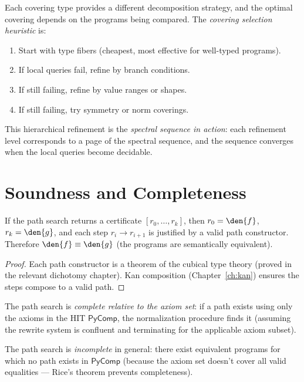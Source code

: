 Each covering type provides a different decomposition strategy,
and the optimal covering depends on the programs being compared.
The \emph{covering selection heuristic} is:
\begin{enumerate}
  \item Start with type fibers (cheapest, most effective for
    well-typed programs).
  \item If local queries fail, refine by branch conditions.
  \item If still failing, refine by value ranges or shapes.
  \item If still failing, try symmetry or norm coverings.
\end{enumerate}

This hierarchical refinement is the \emph{spectral sequence in
action}: each refinement level corresponds to a page of the
spectral sequence, and the sequence converges when the local
queries become decidable.


\section{Soundness and Completeness}

\begin{theorem}
If the path search returns a certificate $[r_0, \ldots, r_k]$, then
$r_0 = \den{f}$, $r_k = \den{g}$, and each step $r_i \to r_{i+1}$
is justified by a valid path constructor.  Therefore
$\den{f} \equiv \den{g}$ (the programs are semantically equivalent).
\end{theorem}

\begin{proof}
Each path constructor is a theorem of the cubical type theory
(proved in the relevant dichotomy chapter).  Kan composition
(Chapter~\ref{ch:kan}) ensures the steps compose to a valid path.
\end{proof}

\begin{theorem}
\label{thm:path-completeness}
The path search is \emph{complete relative to the axiom set}: if
a path exists using only the axioms in the HIT $\mathsf{PyComp}$,
the normalization procedure finds it (assuming the rewrite system
is confluent and terminating for the applicable axiom subset).

The path search is \emph{incomplete} in general: there exist
equivalent programs for which no path exists in $\mathsf{PyComp}$
(because the axiom set doesn't cover all valid equalities ---
Rice's theorem prevents completeness).
\end{theorem}

